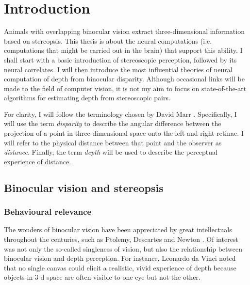 \ifpdf
    \graphicspath{{Introduction/IntroductionFigs/PNG/}{Introduction/IntroductionFigs/PDF/}{Introduction/IntroductionFigs/}}
\else
    \graphicspath{{Introduction/IntroductionFigs/EPS/}{Introduction/IntroductionFigs/}}
\fi

\chapter{Introduction}
Animals with overlapping binocular vision extract three-dimensional information based on stereopsis. This thesis is about the neural computations (i.e. computations that might be carried out in the brain) that support this ability. I shall start with a basic introduction of stereoscopic perception, followed by its neural correlates. I will then introduce the most influential theories of neural computation of depth from binocular disparity. Although occasional links will be made to the field of computer vision, it is not my aim to focus on state-of-the-art algorithms for estimating depth from stereoscopic pairs. 

For clarity, I will follow the terminology chosen by David Marr \cite{Marr:1982:VCI:1095712}. Specifically, I will use the term \textit{disparity} to describe the angular difference between the projection of a point in three-dimensional space onto the left and right retinae. I will refer to the physical distance between that point and the observer as \textit{distance}. Finally, the term \textit{depth} will be used to describe the perceptual experience of distance. 

\section{Binocular vision and stereopsis}

\subsection{Behavioural relevance}

The wonders of binocular vision have been appreciated by great intellectuals throughout the centuries, such as Ptolemy, Descartes and Newton \cite{howard2008seeing}. Of interest was not only the so-called singleness of vision, but also the relationship between binocular vision and depth perception. For instance, Leonardo da Vinci noted that no single canvas could elicit a realistic, vivid experience of depth because objects in 3-d space are often visible to one eye but not the other. 

